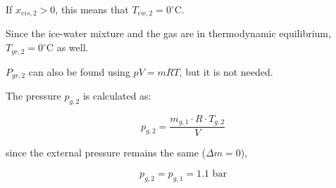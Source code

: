 If \( x_{eis,2} > 0 \), this means that \( T_{ew,2} = 0^\circ \text{C} \).

Since the ice-water mixture and the gas are in thermodynamic equilibrium, \( T_{gr,2} = 0^\circ \text{C} \) as well.

\( P_{gr,2} \) can also be found using \( pV = mRT \), but it is not needed.

The pressure \( p_{g,2} \) is calculated as:

\[
p_{g,2} = \frac{m_{g,1} \cdot R \cdot T_{g,2}}{V}
\]

since the external pressure remains the same (\( \Delta m = 0 \)),

\[
p_{g,2} = p_{g,1} = 1.1 \text{ bar}
\]